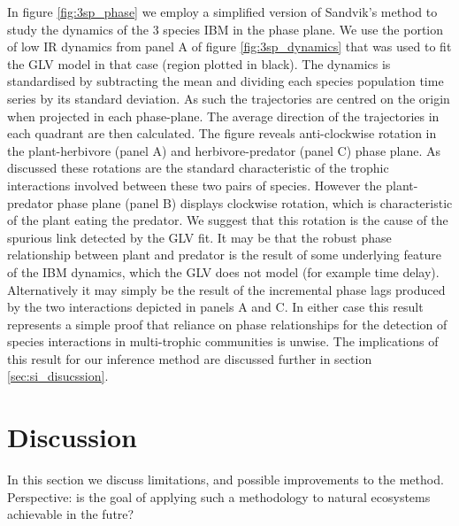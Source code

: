In figure \ref{fig:3sp_phase} we employ a simplified version of Sandvik's method \cite{sandvik2004using} to study the dynamics of the 3 species IBM in the phase plane. We use the portion of low IR dynamics from panel A of figure \ref{fig:3sp_dynamics} that was used to fit the GLV model in that case (region plotted in black). The dynamics is standardised by subtracting the mean and dividing each species population time series by its standard deviation. As such the trajectories are centred on the origin when projected in each phase-plane. The average direction of the trajectories in each quadrant are then calculated. The figure reveals anti-clockwise rotation in the plant-herbivore (panel A) and herbivore-predator (panel C) phase plane. As discussed these rotations are the standard characteristic of the trophic interactions involved between these two pairs of species. However the plant-predator phase plane (panel B) displays clockwise rotation, which is characteristic of the plant eating the predator. We suggest that this rotation is the cause of the spurious link detected by the GLV fit. It may be that the robust phase relationship between plant and predator is the result of some underlying feature of the IBM dynamics, which the GLV does not model (for example time delay). Alternatively it may simply be the result of the incremental phase lags produced by the two interactions depicted in panels A and C. In either case this result represents a simple proof that reliance on phase relationships for the detection of species interactions in multi-trophic communities is unwise. The implications of this result for our inference method are discussed further in section \ref{sec:si_disucssion}.


\section{Discussion}
\label{sec:si_discussion}

In this section we discuss limitations, and possible improvements to the method. Perspective: is the goal of applying such a methodology to natural ecosystems achievable in the futre?


